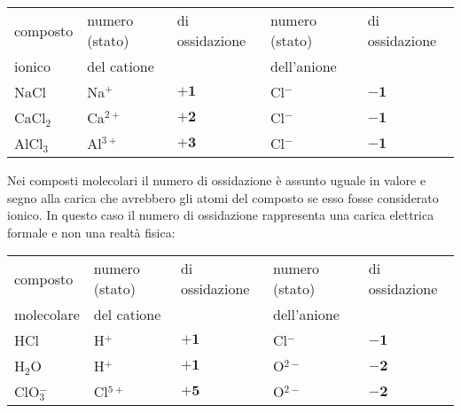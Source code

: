 \begin{center}
  \begin{tabular}{|l|ll|ll|}
    \hline
    composto & numero (stato) & \hspace{-0.4cm} di ossidazione  & numero (stato) & \hspace{-0.4cm} di ossidazione\\
    ionico & del catione & & dell'anione & \\
    \hline
    NaCl & \hspace{1cm}Na$^+$ & $\boldsymbol{+1}$ & \hspace{1cm}Cl$^-$ & $\boldsymbol{-1}$\\
    \hline
    CaCl$_2$ & \hspace{1cm}Ca$^{2+}$ & $\boldsymbol{+2}$ & \hspace{1cm}Cl$^-$ & $\boldsymbol{-1}$\\
    \hline
    AlCl$_3$ & \hspace{1cm}Al$^{3+}$ & $\boldsymbol{+3}$ & \hspace{1cm}Cl$^-$ & $\boldsymbol{-1}$\\
    \hline
  \end{tabular}
\end{center}

Nei composti molecolari il numero di ossidazione è assunto uguale in valore e segno alla carica che avrebbero gli atomi del composto se esso fosse considerato ionico.
In questo caso il numero di ossidazione rappresenta una carica elettrica
formale e non una realtà fisica:

\begin{center}
  \begin{tabular}{|l|ll|ll|}
    \hline
    composto & numero (stato) & \hspace{-0.4cm} di ossidazione  & numero (stato) & \hspace{-0.4cm} di ossidazione\\
    molecolare & del catione & & dell'anione & \\
    \hline
    HCl & \hspace{1cm}H$^+$ & $\boldsymbol{+1}$ & \hspace{1cm}Cl$^-$ & $\boldsymbol{-1}$\\
    \hline
    H$_2$O & \hspace{1cm}H$^+$ & $\boldsymbol{+1}$ & \hspace{1cm}O$^{2-}$ & $\boldsymbol{-2}$\\
    \hline
    ClO$_3^-$ & \hspace{1cm}Cl$^{5+}$ & $\boldsymbol{+5}$ & \hspace{1cm}O$^{2-}$ & $\boldsymbol{-2}$\\
    \hline
  \end{tabular}
\end{center}

